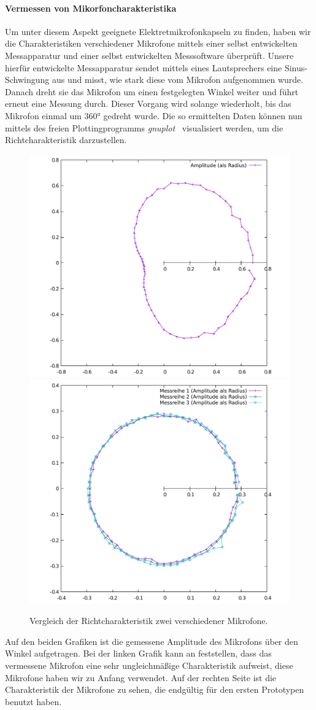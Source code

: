 \paragraph{Vermessen von Mikorfoncharakteristika}
Um unter diesem Aspekt geeignete Elektretmikrofonkapseln zu finden, haben wir die Charakteristiken verschiedener Mikrofone mittels einer selbst entwickelten Messapparatur und einer selbst entwickelten Messsoftware überprüft. Unsere hierfür entwickelte Messapparatur sendet mittels eines Lautsprechers eine Sinus-Schwingung aus und misst, wie stark diese vom Mikrofon aufgenommen wurde. Danach dreht sie das Mikrofon um einen festgelegten Winkel weiter und führt erneut eine Messung durch. Dieser Vorgang wird solange wiederholt, bis das Mikrofon einmal um \ang{360} gedreht wurde.
Die so ermittelten Daten können nun mittels des freien Plottingprogramms \textit{gnuplot}~\cite{Gnuplot} visualisiert werden, um die Richtcharakteristik darzustellen.
\begin{figure}[H]
    \centering
    \includegraphics[width=0.45\linewidth]{img/badMic}
    \includegraphics[width=0.45\linewidth]{img/goodMic}
    \caption{Vergleich der Richtcharakteristik zwei verschiedener Mikrofone.\label{fig:caracter}}
\end{figure}
Auf den beiden Grafiken ist die gemessene Amplitude des Mikrofons über den Winkel aufgetragen. Bei der linken Grafik kann an feststellen, dass das vermessene Mikrofon eine sehr ungleichmäßige Charakteristik aufweist, diese Mikrofone haben wir zu Anfang verwendet. Auf der rechten Seite ist die Charakteristik der Mikrofone zu sehen, die endgültig für den ersten Prototypen benutzt haben.\\
